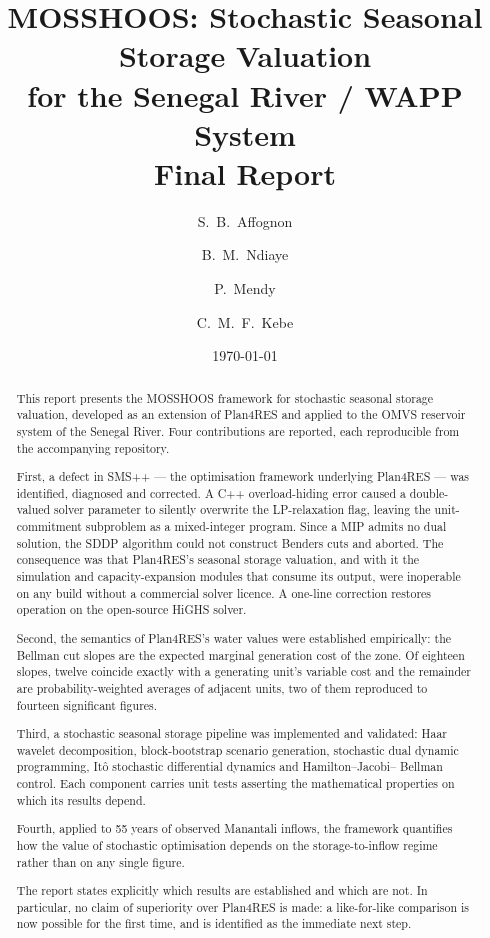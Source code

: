 \documentclass[12pt,a4paper]{article}
\title{\textbf{MOSSHOOS: Stochastic Seasonal Storage Valuation\\for the Senegal River / WAPP System}\\[0.3em]
\large Final Report}
\author[1]{S.~B.~Affognon}
\author[1]{B.~M.~Ndiaye}
\author[1]{P.~Mendy}
\author[1]{C.~M.~F.~Kebe}
\affil[1]{Université Cheikh Anta Diop de Dakar}
\date{\today}
\begin{document}
\maketitle

\begin{abstract}
\noindent
This report presents the MOSSHOOS framework for stochastic seasonal storage
valuation, developed as an extension of Plan4RES and applied to the OMVS
reservoir system of the Senegal River. Four contributions are reported, each
reproducible from the accompanying repository.

First, a defect in SMS++ --- the optimisation framework underlying Plan4RES ---
was identified, diagnosed and corrected. A C++ overload-hiding error caused a
double-valued solver parameter to silently overwrite the LP-relaxation flag,
leaving the unit-commitment subproblem as a mixed-integer program. Since a MIP
admits no dual solution, the SDDP algorithm could not construct Benders cuts and
aborted. The consequence was that Plan4RES's seasonal storage valuation, and
with it the simulation and capacity-expansion modules that consume its output,
were inoperable on any build without a commercial solver licence. A one-line
correction restores operation on the open-source HiGHS solver.

Second, the semantics of Plan4RES's water values were established empirically:
the Bellman cut slopes are the expected marginal generation cost of the zone. Of
eighteen slopes, twelve coincide exactly with a generating unit's variable cost
and the remainder are probability-weighted averages of adjacent units, two of
them reproduced to fourteen significant figures.

Third, a stochastic seasonal storage pipeline was implemented and validated:
Haar wavelet decomposition, block-bootstrap scenario generation, stochastic dual
dynamic programming, Itô stochastic differential dynamics and Hamilton--Jacobi--%
Bellman control. Each component carries unit tests asserting the mathematical
properties on which its results depend.

Fourth, applied to 55 years of observed Manantali inflows, the framework
quantifies how the value of stochastic optimisation depends on the
storage-to-inflow regime rather than on any single figure.

The report states explicitly which results are established and which are not. In
particular, no claim of superiority over Plan4RES is made: a like-for-like
comparison is now possible for the first time, and is identified as the immediate
next step.
\end{abstract}
\end{document}
